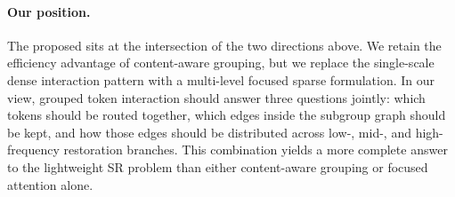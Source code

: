 \paragraph{Our position.}
The proposed \method{} sits at the intersection of the two directions above. We retain the efficiency advantage of content-aware grouping, but we replace the single-scale dense interaction pattern with a multi-level focused sparse formulation. In our view, grouped token interaction should answer three questions jointly: which tokens should be routed together, which edges inside the subgroup graph should be kept, and how those edges should be distributed across low-, mid-, and high-frequency restoration branches. This combination yields a more complete answer to the lightweight SR problem than either content-aware grouping or focused attention alone.
